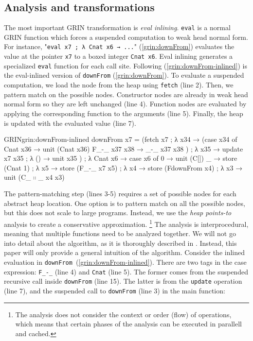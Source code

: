 \documentclass[9pt, twocolumn]{article}
\newcommand{\refp}[1]{(\ref{#1})}
\begin{document}
\subsection{Analysis and transformations}
\label{sec:analysis-and-transformations}
The most important GRIN transformation is \emph{eval inlining}. 
\lstinline{eval} is a normal GRIN function which forces a suspended computation to weak head normal form.
For instance, "\lstinline{eval x7 ; λ Cnat x6 → ...}" \refp{grin:downFrom} evaluates the value at the pointer \lstinline{x7} to a boxed integer \lstinline{Cnat x6}.
Eval inlining generates a specialized \lstinline{eval} function for each call site.
Following \refp{grin:downFrom-inlined} is the \mbox{eval-inlined} version of \lstinline{downFrom} \refp{grin:downFrom}.
To evaluate a suspended computation, we load the node from the heap using \lstinline{fetch} (line 2). 
Then, we pattern match on the possible nodes. 
Constructor nodes are already in weak head normal form so they are left unchanged (line 4).
Function nodes are evaluated by applying the corresponding function to the arguments (line 5).
Finally, the heap is updated with the evaluated value (line 7).

\begin{typewriter}[left]{GRIN}{grin:downFrom-inlined}
downFrom x7 =
  (fetch x7 ; λ x34 →
   (case x34 of
      Cnat x36 → unit (Cnat x36)
      F_-_ x37 x38 → _-_ x37 x38
   ) ; λ x35 →
   update x7 x35 ; λ () →
   unit x35
  ) ; λ Cnat x6 →
  case x6 of
    0 → unit (C[])
    _ →
      store (Cnat 1) ; λ x5 →
      store (F_-_ x7 x5) ; λ x4 →
      store (FdownFrom x4) ; λ x3 →
      unit (C_$∷$_ x4 x3)
\end{typewriter}
The pattern-matching step (lines 3-5) requires a set of possible nodes for each abstract heap location.
One option is to pattern match on all the possible nodes, but this does not scale to large programs.
Instead, we use the \emph{heap points-to} analysis \citep{johnsson1991} to create a conservative approximation.%
\footnote{%
The analysis does not consider the context or order (flow) of operations, which means that certain phases of the analysis can be executed in parallell and cached. 

}
The analysis is interprocedural, meaning that multiple functions need to be analyzed together.
We will not go into detail about the algorithm, as it is thoroughly described in \citep{boquist1996, johnsson1991}. 
Instead, this paper will only provide a general intuition of the algorithm.
Consider the inlined evaluation in \mbox{\lstinline{downFrom} \refp{grin:downFrom-inlined}}.
There are two tags in the case expression: \lstinline{F_-_} (line 4) and \lstinline{Cnat} (line 5). 
The former comes from the suspended recursive call inside \lstinline{downFrom} (line 15). 
The latter is from the \lstinline{update} operation (line 7), and the suspended call to \lstinline{downFrom} (line 3) in the main function:
\end{document}
